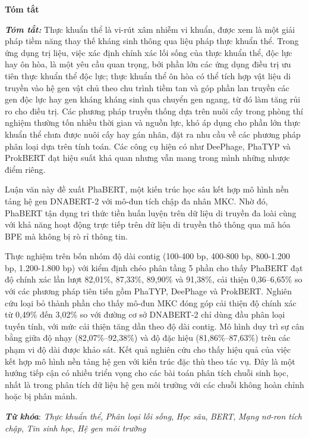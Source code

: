 \begin{center}
\textbf{\large{Tóm tắt}	}
\end{center}


\begin{small}
\textbf{\textit{Tóm tắt:}} Thực khuẩn thể là vi-rút xâm nhiễm vi khuẩn, được xem là một giải pháp tiềm năng thay thế kháng sinh thông qua liệu pháp thực khuẩn thể. Trong ứng dụng trị liệu, việc xác định chính xác lối sống của thực khuẩn thể, độc lực hay ôn hòa, là một yêu cầu quan trọng, bởi phần lớn các ứng dụng điều trị ưu tiên thực khuẩn thể độc lực; thực khuẩn thể ôn hòa có thể tích hợp vật liệu di truyền vào hệ gen vật chủ theo chu trình tiềm tan và góp phần lan truyền các gen độc lực hay gen kháng kháng sinh qua chuyển gen ngang, từ đó làm tăng rủi ro cho điều trị. Các phương pháp truyền thống dựa trên nuôi cấy trong phòng thí nghiệm thường tốn nhiều thời gian và nguồn lực, khó áp dụng cho phần lớn thực khuẩn thể chưa được nuôi cấy hay gán nhãn, đặt ra nhu cầu về các phương pháp phân loại dựa trên tính toán. Các công cụ hiện có như DeePhage, PhaTYP và ProkBERT đạt hiệu suất khả quan nhưng vẫn mang trong mình những nhược điểm riêng.

Luận văn này đề xuất PhaBERT, một kiến trúc học sâu kết hợp mô hình nền tảng hệ gen DNABERT-2 với mô-đun tích chập đa nhân MKC. Nhờ đó, PhaBERT tận dụng tri thức tiền huấn luyện trên dữ liệu di truyền đa loài cùng với khả năng hoạt động trực tiếp trên dữ liệu di truyền thô thông qua mã hóa BPE mà không bị rò rỉ thông tin.

Thực nghiệm trên bốn nhóm độ dài contig (100-400 bp, 400-800 bp, 800-1.200 bp, 1.200-1.800 bp) với kiểm định chéo phân tầng 5 phần cho thấy PhaBERT đạt độ chính xác lần lượt 82,01\%, 87,33\%, 89,90\% và 91,38\%, cải thiện 0,36--6,65\% so với các phương pháp tiên tiến gồm PhaTYP, DeePhage và ProkBERT. Nghiên cứu loại bỏ thành phần cho thấy mô-đun MKC đóng góp cải thiện độ chính xác từ 0,49\% đến 3,02\% so với đường cơ sở DNABERT-2 chỉ dùng đầu phân loại tuyến tính, với mức cải thiện tăng dần theo độ dài contig. Mô hình duy trì sự cân bằng giữa độ nhạy (82,07\%--92,38\%) và độ đặc hiệu (81,86\%--87,63\%) trên các phạm vi độ dài được khảo sát. Kết quả nghiên cứu cho thấy hiệu quả của việc kết hợp mô hình nền tảng hệ gen với kiến trúc đặc thù theo tác vụ. Đây là một hướng tiếp cận có nhiều triển vọng cho các bài toán phân tích chuỗi sinh học, nhất là trong phân tích dữ liệu hệ gen môi trường với các chuỗi không hoàn chỉnh hoặc bị phân mảnh.

\vspace*{1cm}
\textbf{\textit{Từ khóa}}: \textit{Thực khuẩn thể}, \textit{Phân loại lối sống}, \textit{Học sâu}, \textit{BERT}, \textit{Mạng nơ-ron tích chập}, \textit{Tin sinh học}, \textit{Hệ gen môi trường}

\end{small}
